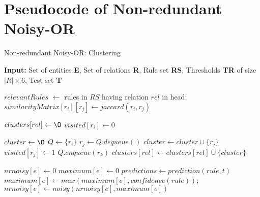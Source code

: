 \documentclass[akbc,twoside,11pt,lettersize]{article}
\begin{document}
\section{Pseudocode of Non-redundant Noisy-OR}
\label{appendix:pseudo}
\begin{algorithm}
\scriptsize
\caption{Non-redundant Noisy-OR: Clustering}
\label{PseudoNRNO}
    \begin{algorithmic}
        \State \textbf{Input:} Set of entities \textbf{E}, Set of relations \textbf{R}, Rule set \textbf{RS}, Thresholds \textbf{TR} of size $|R| \times 6$, Test set \textbf{T}
         
        
            \State $relevantRules$ $\gets$ rules in $RS$ having relation $rel$ in head;
                    \State $similarityMatrix[r_i][r_j] \gets jaccard(r_i, r_j)$
                \EndFor
            \EndFor
            
            \State $clusters[rel] \gets \O$
                \State $visited[r_i] \gets 0$
            \EndFor
                
                    \State $cluster \gets \O$
                    \State $Q \gets \{r_i\}$
                        \State $r_j \gets Q.dequeue()$
                        \State $cluster \gets cluster \cup \{r_j\}$
                        \State $visited[r_j] \gets 1$
                                    \State $Q.enqueue(r_k)$
                                \EndIf
                            \EndIf
                        \EndFor
                    \EndWhile
                    \State $clusters[rel] \gets clusters[rel] \cup \{cluster\}$
                \EndIf
            \EndFor
        \EndFor
        
         
                \State $nrnoisy[e] \gets 0$
            \EndFor
                    \State $maximum[e] \gets 0$
                \EndFor
                    \State $predictions \gets prediction(rule, t)$
                            \State $maximum[e] \gets max(maximum[e], confidence(rule))$;
                        \EndIf
                    \EndFor
                \EndFor
                    \State $nrnoisy[e] \gets noisy(nrnoisy[e], maximum[e])$
                \EndFor
            \EndFor
       \EndFor
        
        
    \end{algorithmic}
\end{algorithm}
\end{document}
